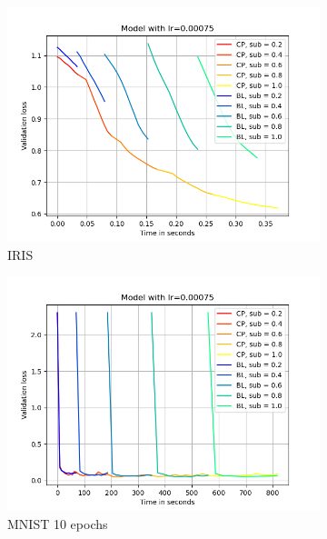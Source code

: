 \begin{figure}[h]
    \centering
    \begin{subfigure}[b]{0.24\textwidth}
        \centering
        \includegraphics[width=\textwidth]{figures/22_07/iris/loss_time_0.00075.png}
        \caption{IRIS}
        \label{fig:13a}
    \end{subfigure}
    \begin{subfigure}[b]{0.24\textwidth}
        \centering
        \includegraphics[width=\textwidth]{figures/22_07/10ep/loss_time_0.00075.png}
        \caption{MNIST 10 epochs}
        \label{fig:13b}
    \end{subfigure}
    \begin{subfigure}[b]{0.24\textwidth}

\end{subfigure}
\end{figure}
